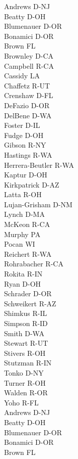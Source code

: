 \begin{multicols}{3}
\noindent
Andrews D-NJ \\
Beatty D-OH \\
Blumenauer D-OR \\
Bonamici D-OR \\
Brown FL \\
Brownley D-CA \\
Campbell R-CA \\
Cassidy LA \\
Chaffetz R-UT \\
Crenshaw D-FL \\
DeFazio D-OR \\
DelBene D-WA \\
Foster D-IL \\
Fudge D-OH \\
Gibson R-NY \\
Hastings R-WA \\
Herrera-Beutler R-WA \\
Kaptur D-OH \\
Kirkpatrick D-AZ \\
Latta R-OH \\
Lujan-Grisham D-NM \\
Lynch D-MA \\
McKeon R-CA \\
Murphy PA \\
Pocan WI \\
Reichert R-WA \\
Rohrabacher R-CA \\
Rokita R-IN \\
Ryan D-OH \\
Schrader D-OR \\
Schweikert R-AZ \\
Shimkus R-IL \\
Simpson R-ID \\
Smith D-WA \\
Stewart R-UT \\
Stivers R-OH \\
Stutzman R-IN \\
Tonko D-NY \\
Turner R-OH \\
Walden R-OR \\
Yoho R-FL \\
Andrews D-NJ \\
Beatty D-OH \\
Blumenauer D-OR \\
Bonamici D-OR \\
Brown FL \\

\end{multicols}

